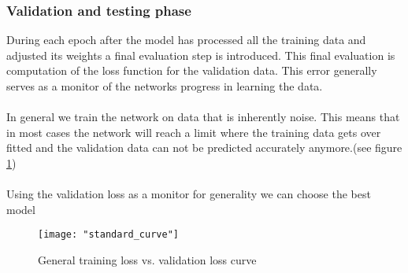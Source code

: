 \documentclass[12pt]{article}
\begin{document}
\subsubsection{Validation and testing phase}
During each epoch after the model has processed all the training data and adjusted its weights a final evaluation step is introduced. This final evaluation is computation of the loss function for the validation data. This error generally serves as a monitor of the networks progress in learning the data.
\\
\\
In general we train the network on data that is inherently noise. This means that in most cases the network will reach a limit where the training data gets over fitted and the validation data can not be predicted accurately anymore.(see figure \ref{fig:curve}) \cite{Bishop2013,Haykin2008,Budumu,P.Murphy1991,TrevorHastie2009}
\\
\\
Using the validation loss as a monitor for generality we can choose the best model 
\begin{figure}[h]
	\centering
	\texttt{[image: "standard\_curve"]}
	\caption{General training loss vs. validation loss curve \cite{standardcurve}}
	\label{fig:curve}
\end{figure}
\newpage
\\
\\
\cleardoublepage
\newpage
\end{document}
